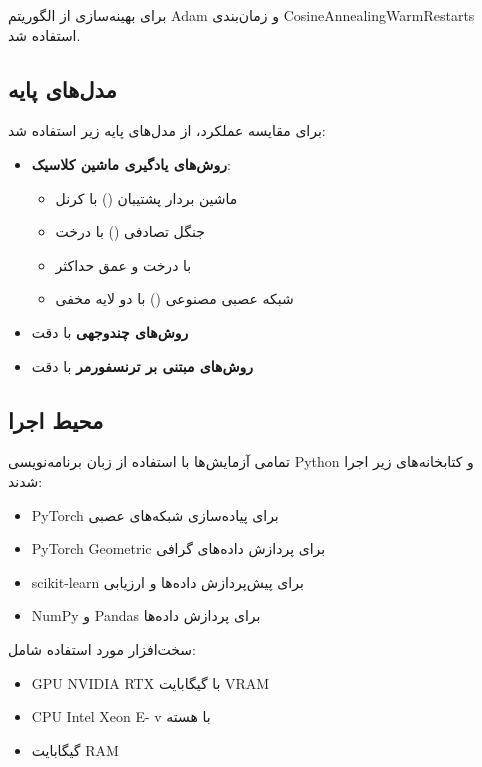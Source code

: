برای بهینه‌سازی از الگوریتم Adam و زمان‌بندی CosineAnnealingWarmRestarts استفاده شد.

\subsection{مدل‌های پایه}
برای مقایسه عملکرد، از مدل‌های پایه زیر استفاده شد:
\begin{itemize}
    \item \textbf{روش‌های یادگیری ماشین کلاسیک}:
    \begin{itemize}
        \item ماشین بردار پشتیبان () با کرنل 
        \item جنگل تصادفی () با  درخت
        \item {} با  درخت و عمق حداکثر 
        \item شبکه عصبی مصنوعی () با دو لایه مخفی
    \end{itemize}
    \item \textbf{روش‌های چندوجهی} با دقت  \cite{Alsaleh2023}
    \item \textbf{روش‌های مبتنی بر ترنسفورمر} با دقت  \cite{TransformerMalware}
\end{itemize}

\subsection{محیط اجرا}
تمامی آزمایش‌ها با استفاده از زبان برنامه‌نویسی Python  و کتابخانه‌های زیر اجرا شدند:
\begin{itemize}
    \item PyTorch  برای پیاده‌سازی شبکه‌های عصبی
    \item PyTorch Geometric  برای پردازش داده‌های گرافی
    \item scikit-learn  برای پیش‌پردازش داده‌ها و ارزیابی
    \item NumPy  و Pandas  برای پردازش داده‌ها
\end{itemize}

سخت‌افزار مورد استفاده شامل:
\begin{itemize}
    \item GPU NVIDIA RTX  با  گیگابایت VRAM
    \item CPU Intel Xeon E- v با  هسته
    \item {} گیگابایت RAM
\end{itemize}

